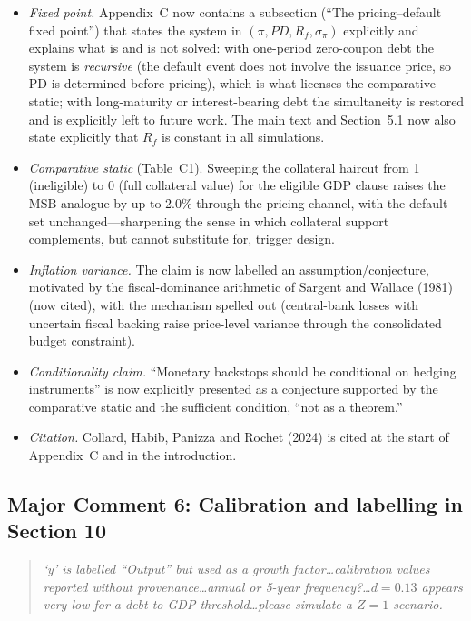 \documentclass[11pt]{article}
\newcounter{comment}
\newenvironment{revcomment}%
{\refstepcounter{comment}\par\medskip\noindent\begin{quote}\itshape\color{black!70}}%
{\end{quote}\medskip}
\begin{document}
\begin{itemize}
\item \emph{Fixed point.} Appendix~C now contains a subsection (``The pricing--default fixed point'') that states the system in $(\pi, PD, R_f, \sigma_\pi)$ explicitly and explains what is and is not solved: with one-period zero-coupon debt the system is \emph{recursive} (the default event does not involve the issuance price, so PD is determined before pricing), which is what licenses the comparative static; with long-maturity or interest-bearing debt the simultaneity is restored and is explicitly left to future work. The main text and Section~5.1 now also state explicitly that $R_f$ is constant in all simulations.
\item \emph{Comparative static} (Table~C1). Sweeping the collateral haircut from 1 (ineligible) to 0 (full collateral value) for the eligible GDP clause raises the MSB analogue by up to 2.0\% through the pricing channel, with the default set unchanged---sharpening the sense in which collateral support complements, but cannot substitute for, trigger design.
\item \emph{Inflation variance.} The claim is now labelled an assumption/conjecture, motivated by the fiscal-dominance arithmetic of Sargent and Wallace (1981) (now cited), with the mechanism spelled out (central-bank losses with uncertain fiscal backing raise price-level variance through the consolidated budget constraint).
\item \emph{Conditionality claim.} ``Monetary backstops should be conditional on hedging instruments'' is now explicitly presented as a conjecture supported by the comparative static and the sufficient condition, ``not as a theorem.''
\item \emph{Citation.} Collard, Habib, Panizza and Rochet (2024) is cited at the start of Appendix~C and in the introduction.
\end{itemize}

\subsection*{Major Comment 6: Calibration and labelling in Section 10}

\begin{revcomment}
`y' is labelled ``Output'' but used as a growth factor\ldots calibration values reported without provenance\ldots annual or 5-year frequency?\ldots $d=0.13$ appears very low for a debt-to-GDP threshold\ldots please simulate a $Z=1$ scenario.
\end{revcomment}
\end{document}
